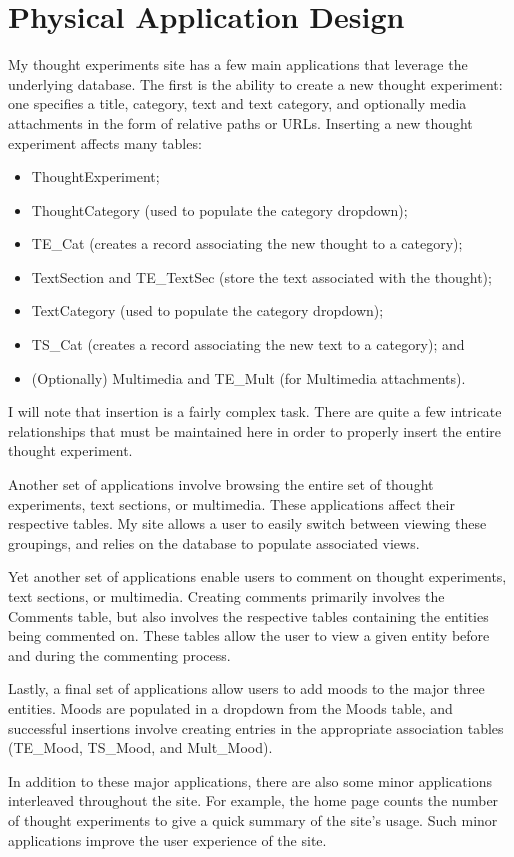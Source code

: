 \section{Physical Application Design}
My thought experiments site has a few main applications that leverage the underlying
database.
The first is the ability to create a new thought experiment:
one specifies a title, category, text and text category,
and optionally media attachments in the form of relative paths or URLs.
Inserting a new thought experiment affects many tables:
\begin{itemize}
    \item ThoughtExperiment;
    \item ThoughtCategory (used to populate the category dropdown);
    \item TE\_Cat (creates a record associating the new thought to a category);
    \item TextSection and TE\_TextSec (store the text associated with the thought);
    \item TextCategory (used to populate the category dropdown);
    \item TS\_Cat (creates a record associating the new text to a category); and
    \item (Optionally) Multimedia and TE\_Mult (for Multimedia attachments).
\end{itemize}
I will note that insertion is a fairly complex task.
There are quite a few intricate relationships that must be maintained here
in order to properly insert the entire thought experiment.

Another set of applications involve browsing the entire set of 
thought experiments, text sections, or multimedia.  These applications
affect their respective tables. My site allows a user to easily switch
between viewing these groupings, and relies on the database to populate 
associated views.

Yet another set of applications enable users to comment on
thought experiments, text sections, or multimedia.
Creating comments primarily involves the Comments table,
but also involves the respective tables containing the entities
being commented on.  These tables allow the user to view
a given entity before and during the commenting process.

Lastly, a final set of applications allow users to
add moods to the major three entities.
Moods are populated in a dropdown from the Moods table,
and successful insertions involve creating entries in the appropriate
association tables (TE\_Mood, TS\_Mood, and Mult\_Mood).

In addition to these major applications,
there are also some minor applications interleaved throughout the site.  
For example, the home page counts the number
of thought experiments to give a quick summary of the site's usage.
Such minor applications improve the user experience of the site.
